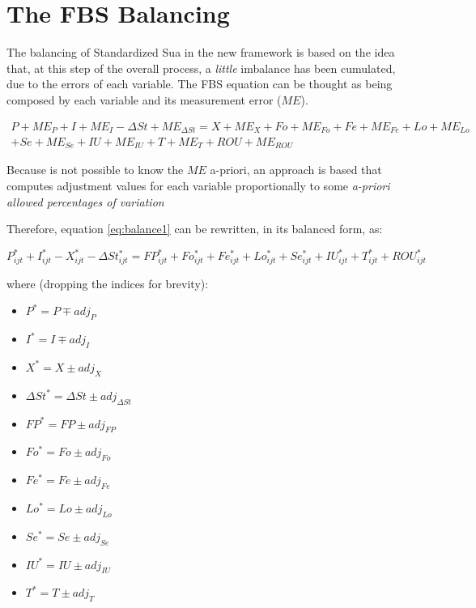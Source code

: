 \documentclass[]{article}
\providecommand{\tightlist}{%
  \setlength{\itemsep}{0pt}\setlength{\parskip}{0pt}}
\begin{document}
\section{The FBS Balancing}\label{the-fbs-balancing}

The balancing of Standardized Sua in the new framework is based on the
idea that, at this step of the overall process, a \emph{little}
imbalance has been cumulated, due to the errors of each variable. The
FBS equation can be thought as being composed by each variable and its
measurement error (\(ME\)).

\begin{multline}
\label{eq:balance_b}
    P + ME_{P} + I + ME_{I} - \Delta St + ME_{\Delta St} = X + ME_{X} + Fo +ME_{Fo} + Fe + ME_{Fe} + Lo + ME_{Lo} \\
    + Se + ME_{Se} + IU + ME_{IU} + T + ME_{T} + ROU + ME_{ROU}
\end{multline}

Because is not possible to know the \(ME\) a-priori, an approach is
based that computes adjustment values for each variable proportionally
to some \emph{a-priori allowed percentages of variation}

Therefore, equation \ref{eq:balance1} can be rewritten, in its balanced
form, as:

\begin{equation}
\label{eq:balance3}
P^*_{ijt} + I^*_{ijt} - X^*_{ijt} - \Delta St^*_{ijt} = FP^*_{ijt} + Fo^*_{ijt} + Fe^*_{ijt} + Lo^*_{ijt} + Se^*_{ijt} + IU^*_{ijt} + T^*_{ijt}  + ROU^*_{ijt}
\end{equation}

where (dropping the indices for brevity):

\begin{itemize}
\tightlist
\item
  \(P^* = P \mp adj_{P}\)
\item
  \(I^* = I \mp adj_{I}\)
\item
  \(X^* = X \pm adj_{X}\)
\item
  \(\Delta St^* = \Delta St \pm adj_{\Delta St}\)
\item
  \(FP^* = FP \pm adj_{FP}\)
\item
  \(Fo^* = Fo \pm adj_{Fo}\)
\item
  \(Fe^* = Fe \pm adj_{Fe}\)
\item
  \(Lo^* = Lo \pm adj_{Lo}\)
\item
  \(Se^* = Se \pm adj_{Se}\)
\item
  \(IU^* = IU \pm adj_{IU}\)
\item
  \(T^* = T \pm adj_{T}\)
\end{itemize}
\end{document}
